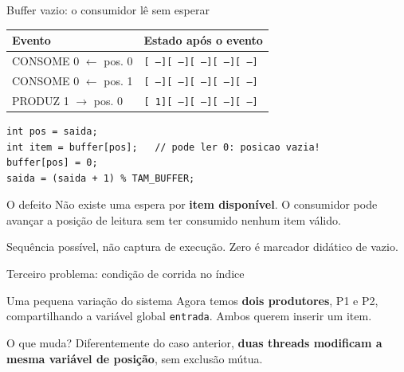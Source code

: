 \documentclass[aspectratio=169,11pt]{beamer}
\begin{document}
\begin{frame}[fragile]{Buffer vazio: o consumidor lê sem esperar}
\begin{center}
\begin{tabular}{ll}
\toprule
\textbf{Evento} & \textbf{Estado após o evento}\\
\midrule
\textcolor{azulcons}{CONSOME 0 $\leftarrow$ pos. 0} & \texttt{[ --][ --][ --][ --][ --]} \\
\textcolor{azulcons}{CONSOME 0 $\leftarrow$ pos. 1} & \texttt{[ --][ --][ --][ --][ --]} \\
\textcolor{verdeprod}{PRODUZ 1 $\rightarrow$ pos. 0} & \texttt{[ 1][ --][ --][ --][ --]} \\
\bottomrule
\end{tabular}
\end{center}
\vspace{.4em}
\begin{lstlisting}
int pos = saida;
int item = buffer[pos];   // pode ler 0: posicao vazia!
buffer[pos] = 0;
saida = (saida + 1) % TAM_BUFFER;
\end{lstlisting}
\begin{block}{O defeito}
Não existe uma espera por \textbf{item disponível}. O consumidor pode avançar a posição de leitura sem ter consumido nenhum item válido.
\end{block}
\footnotesize\textcolor{cinza}{Sequência possível, não captura de execução. Zero é marcador didático de vazio.}
\end{frame}

\begin{frame}{Terceiro problema: condição de corrida no índice}
\begin{block}{Uma pequena variação do sistema}
Agora temos \textbf{dois produtores}, P1 e P2, compartilhando a variável global \texttt{entrada}. Ambos querem inserir um item.
\end{block}
\vspace{.6em}
\begin{center}
\end{center}
\vspace{.5em}
\begin{alertblock}{O que muda?}
Diferentemente do caso anterior, \textbf{duas threads modificam a mesma variável de posição}, sem exclusão mútua.
\end{alertblock}
\end{frame}
\end{document}
